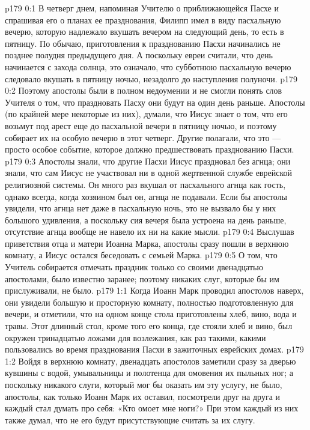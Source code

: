 \vs p179 0:1 В четверг днем, напоминая Учителю о приближающейся Пасхе и спрашивая его о планах ее празднования, Филипп имел в виду пасхальную вечерю, которую надлежало вкушать вечером на следующий день, то есть в пятницу. По обычаю, приготовления к празднованию Пасхи начинались не позднее полудня предыдущего дня. А поскольку евреи считали, что день начинается с захода солнца, это означало, что субботнюю пасхальную вечерю следовало вкушать в пятницу ночью, незадолго до наступления полуночи.
\vs p179 0:2 Поэтому апостолы были в полном недоумении и не смогли понять слов Учителя о том, что праздновать Пасху они будут на один день раньше. Апостолы (по крайней мере некоторые из них), думали, что Иисус знает о том, что его возьмут под арест еще до пасхальной вечери в пятницу ночью, и поэтому собирает их на особую вечерю в этот четверг. Другие полагали, что это --- просто особое событие, которое должно предшествовать празднованию Пасхи.
\vs p179 0:3 Апостолы знали, что другие Пасхи Иисус праздновал без агнца; они знали, что сам Иисус не участвовал ни в одной жертвенной службе еврейской религиозной системы. Он много раз вкушал от пасхального агнца как гость, однако всегда, когда хозяином был он, агнца не подавали. Если бы апостолы увидели, что агнца нет даже в пасхальную ночь, это не вызвало бы у них большого удивления, а поскольку сия вечеря была устроена на день раньше, отсутствие агнца вообще не навело их ни на какие мысли.
\vs p179 0:4 Выслушав приветствия отца и матери Иоанна Марка, апостолы сразу пошли в верхнюю комнату, а Иисус остался беседовать с семьей Марка.
\vs p179 0:5 О том, что Учитель собирается отмечать праздник только со своими двенадцатью апостолами, было известно заранее; поэтому никаких слуг, которые бы им прислуживали, не было.
\vs p179 1:1 Когда Иоанн Марк проводил апостолов наверх, они увидели большую и просторную комнату, полностью подготовленную для вечери, и отметили, что на одном конце стола приготовлены хлеб, вино, вода и травы. Этот длинный стол, кроме того его конца, где стояли хлеб и вино, был окружен тринадцатью ложами для возлежания, как раз такими, какими пользовались во время празднования Пасхи в зажиточных еврейских домах.
\vs p179 1:2 Войдя в верхнюю комнату, двенадцать апостолов заметили сразу за дверью кувшины с водой, умывальницы и полотенца для омовения их пыльных ног; а поскольку никакого слуги, который мог бы оказать им эту услугу, не было, апостолы, как только Иоанн Марк их оставил, посмотрели друг на друга и каждый стал думать про себя: «Кто омоет мне ноги?» При этом каждый из них также думал, что не его будут присутствующие считать за их слугу.
